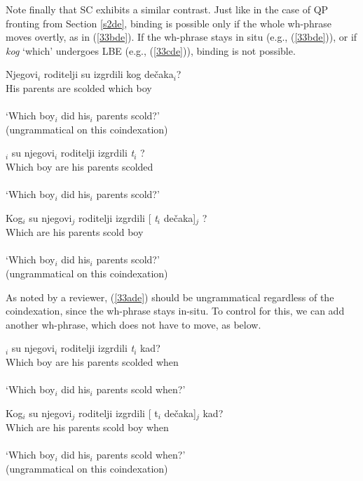 \documentclass[
    output=paper,
    colorlinks,
    citecolor=brown,
]{langscibook}
\begin{document}
Note finally that SC exhibits a similar contrast. Just like in the case of QP fronting from Section \ref{s2de}, binding is possible only if the whole wh-phrase moves overtly, as in (\ref{33bde}). If the wh-phrase stays in situ (e.g., (\ref{33bde})), or if \textit{kog} ‘which’ undergoes LBE (e.g., (\ref{33cde})), binding is not possible.

\begin{exe}
\ex \label{33de}
\begin{xlist}
\ex \label{33ade}
\gll *Njegovi$_{i}$ roditelji su izgrdili kog dečaka$_{i}$?\\
His parents are scolded which boy\\\\
‘Which boy$_{i}$ did his$_{i}$ parents scold?’\\
(ungrammatical on this coindexation)


\ex \label{33bde}
$_{i}$ su njegovi$_{i}$ roditelji izgrdili  \textit{t}$_{i}$ ?\\
Which boy are his parents scolded\\\\
 ‘Which boy$_{i}$ did his$_{i}$ parents scold?’ 
 
\ex \label{33cde}
\gll *Kog$_{i}$    su   njegovi$_{j}$ roditelji izgrdili [ \textit{t}$_{i}$ dečaka]$_{j}$ ?\\
Which are his parents scold {} {} boy\\\\
 ‘Which boy$_{i}$ did his$_{i}$ parents scold?’\\      (ungrammatical on this coindexation)

\end{xlist}
\end{exe}

As noted by a reviewer, (\ref{33ade}) should be ungrammatical regardless of the coindexation, since the wh-phrase stays in-situ. To control for this, we can add another wh-phrase, which does not have to move, as below.

\begin{exe}
\ex \label{34de}
\begin{xlist}
\ex \label{34ade}
$_{i}$ su njegovi$_{i}$ roditelji izgrdili  \textit{t}$_{i}$  kad?\\
Which boy are his parents scolded {} when\\\\
‘Which boy$_{i}$ did his$_{i}$ parents scold when?’ 

\ex \label{34bde}
\gll *Kog$_{i}$ su  njegovi$_{j}$ roditelji izgrdili [  t$_{i}$ dečaka]$_{j}$ kad?\\
Which are his parents scold {} {} boy when\\\\
‘Which boy$_{i}$ did his$_{i}$ parents scold when?’\\
(ungrammatical on this coindexation)
\end{xlist}
\end{exe}
\end{document}
